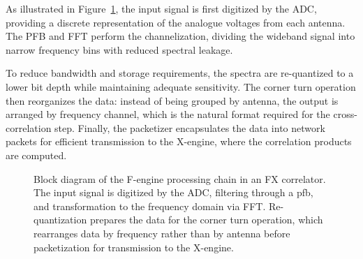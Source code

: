As illustrated in Figure~\ref{fig:f-engine}, the input signal is first digitized by the ADC, providing a discrete representation of the analogue voltages from each antenna. The PFB and FFT perform the channelization, dividing the wideband signal into narrow frequency bins with reduced spectral leakage. 

To reduce bandwidth and storage requirements, the spectra are re-quantized to a lower bit depth while maintaining adequate sensitivity. The corner turn operation then reorganizes the data: instead of being grouped by antenna, the output is arranged by frequency channel, which is the natural format required for the cross-correlation step. Finally, the packetizer encapsulates the data into network packets for efficient transmission to the X-engine, where the correlation products are computed.

\begin{figure}[t]
	\centering
	\caption[Block diagram of the F-engine processing chain]{Block diagram of the F-engine processing chain in an FX correlator. The input signal is digitized by the ADC, filtering through a \gls{pfb}, and transformation to the frequency domain via FFT.  Re-quantization prepares the data for the corner turn operation, which rearranges data by frequency rather than by antenna before packetization for transmission to the X-engine.}
	\label{fig:f-engine}
\end{figure}


